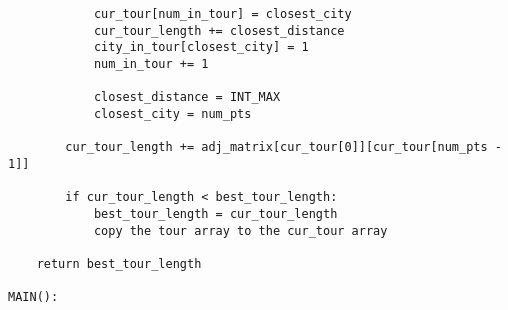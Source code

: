\documentclass[../report/main.tex]{subfiles}
\begin{document}
\begin{verbatim}
            cur_tour[num_in_tour] = closest_city
            cur_tour_length += closest_distance
            city_in_tour[closest_city] = 1
            num_in_tour += 1

            closest_distance = INT_MAX
            closest_city = num_pts

        cur_tour_length += adj_matrix[cur_tour[0]][cur_tour[num_pts - 1]]

        if cur_tour_length < best_tour_length:
            best_tour_length = cur_tour_length
            copy the tour array to the cur_tour array

    return best_tour_length

MAIN():
    
\end{verbatim}
\end{document}
